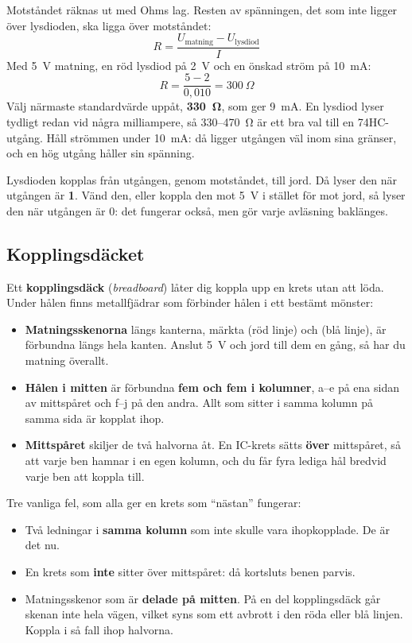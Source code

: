 Motståndet räknas ut med Ohms lag. Resten av spänningen, det som inte ligger över lysdioden, ska
ligga över motståndet:
\[
  R = \frac{U_{\text{matning}} - U_{\text{lysdiod}}}{I}
\]
Med 5~V matning, en röd lysdiod på 2~V och en önskad ström på 10~mA:
\[
  R = \frac{5 - 2}{0,010} = 300\ \Omega
\]
Välj närmaste standardvärde uppåt, \textbf{330~Ω}, som ger 9~mA. En lysdiod lyser tydligt redan vid
några milliampere, så 330--470~Ω är ett bra val till en 74HC-utgång. Håll strömmen under 10~mA: då
ligger utgången väl inom sina gränser, och en hög utgång håller sin spänning.

Lysdioden kopplas från utgången, genom motståndet, till jord. Då lyser den när utgången är
\textbf{1}. Vänd den, eller koppla den mot 5~V i stället för mot jord, så lyser den när utgången är
0: det fungerar också, men gör varje avläsning baklänges.

\subsection{Kopplingsdäcket}
\label{c4:b6}
Ett \textbf{kopplingsdäck} (\emph{breadboard}) låter dig koppla upp en krets utan att löda. Under
hålen finns metallfjädrar som förbinder hålen i ett bestämt mönster:


\begin{itemize}
  \item \textbf{Matningsskenorna} längs kanterna, märkta \code{+} (röd linje) och \code{-} (blå
    linje), är förbundna längs hela kanten. Anslut 5~V och jord till dem en gång, så har du
    matning överallt.
  \item \textbf{Hålen i mitten} är förbundna \textbf{fem och fem i kolumner}, a--e på ena sidan av
    mittspåret och f--j på den andra. Allt som sitter i samma kolumn på samma sida är kopplat
    ihop.
  \item \textbf{Mittspåret} skiljer de två halvorna åt. En IC-krets sätts \textbf{över} mittspåret,
    så att varje ben hamnar i en egen kolumn, och du får fyra lediga hål bredvid varje ben att
    koppla till.
\end{itemize}

Tre vanliga fel, som alla ger en krets som \enquote{nästan} fungerar:
\begin{itemize}
  \item Två ledningar i \textbf{samma kolumn} som inte skulle vara ihopkopplade. De är det nu.
  \item En krets som \textbf{inte} sitter över mittspåret: då kortsluts benen parvis.
  \item Matningsskenor som är \textbf{delade på mitten}. På en del kopplingsdäck går skenan inte
    hela vägen, vilket syns som ett avbrott i den röda eller blå linjen. Koppla i så fall ihop
    halvorna.
\end{itemize}

